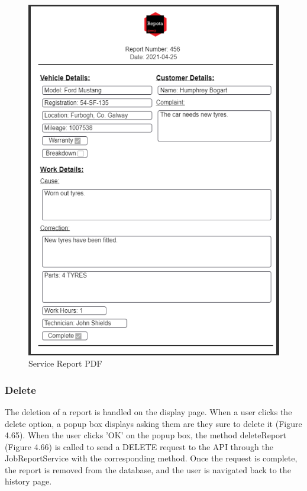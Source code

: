 \begin{figure}[H]
    \centering
    \caption{Service Report PDF}
    \label{image:reportPDF}
    \includegraphics[width=1.0\textwidth]{images/repota/service_report_pdf.png}
\end{figure}

\subsubsection{Delete}
The deletion of a report is handled on the display page. When a user clicks the delete option, a popup box displays asking them are they sure to delete it (Figure 4.65). When the user clicks 'OK' on the popup box, the method deleteReport (Figure 4.66) is called to send a DELETE request to the API through the JobReportService with the corresponding method. Once the request is complete, the report is removed from the database, and the user is navigated back to the history page.

